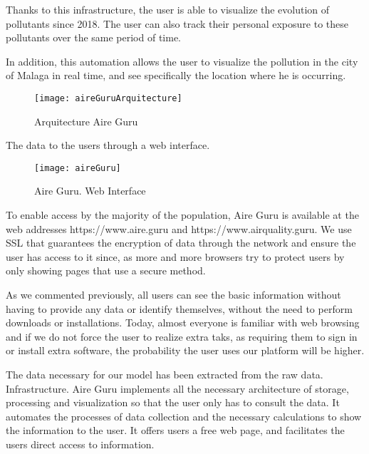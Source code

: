 Thanks to this infrastructure, the user is able to visualize the evolution of pollutants since 2018. The user can also track their personal exposure
 to these pollutants over the same period of time.

In addition, this automation allows the user to visualize the pollution in the city of Malaga in real time, and see specifically the location where he is 
occurring. \\
\newpage

\begin{figure}[ht]
    \centering
    \texttt{[image: aireGuruArquitecture]}
    \caption{Arquitecture Aire Guru}
\end{figure}

The data to the users through a web interface. \\

\begin{figure}[ht]
    \centering
    \texttt{[image: aireGuru]}
    \caption{Aire Guru. Web Interface}
\end{figure}

To enable access by the majority of the population, Aire Guru is available at the web addresses https://www.aire.guru and https://www.airquality.guru.
We use SSL that guarantees the encryption of data through the network and ensure the user has access to it since, as more and more browsers try to protect 
users by only showing pages that use a secure method.

As we commented previously, all users can see the basic information without having to provide any data or identify themselves, without the need to
perform downloads or installations. Today, almost everyone is familiar with web browsing and if we do not force the user to realize extra taks, as 
requiring them to sign in or install extra software, the probability the user uses our platform will be higher. 

\newpage
{}  
\begin{itemize}
\done The data necessary for our model has been extracted from the raw data.
\done Infrastructure. Aire Guru implements all the necessary architecture of storage, processing and visualization so that the user only has to consult
the data.
\done It automates the processes of data collection and the necessary calculations to show the information to the user.
\done It offers users a free web page, and facilitates the users direct access to information.
\end{itemize}

